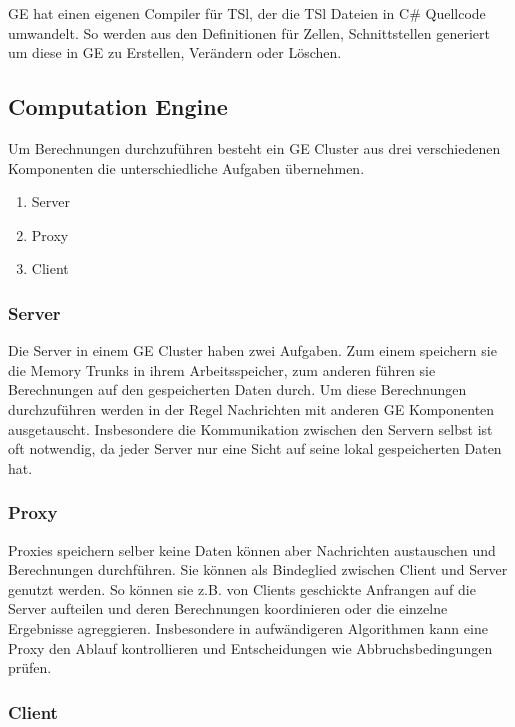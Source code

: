 GE hat einen eigenen Compiler für TSl, der die TSl Dateien in C\# Quellcode umwandelt. So werden aus den Definitionen für Zellen, Schnittstellen
generiert um diese in GE zu Erstellen, Verändern oder Löschen. 

\subsection{Computation Engine}

Um Berechnungen durchzuführen besteht ein GE Cluster aus drei verschiedenen Komponenten die unterschiedliche Aufgaben übernehmen.

\begin{enumerate}
  \item Server
  \item Proxy
  \item Client
\end{enumerate}


\subsubsection{Server}

Die Server in einem GE Cluster haben zwei Aufgaben. Zum einem speichern sie die Memory Trunks in ihrem Arbeitsspeicher, 
zum anderen führen sie Berechnungen auf den gespeicherten Daten durch.
Um diese Berechnungen durchzuführen werden in der Regel Nachrichten mit anderen GE Komponenten ausgetauscht. Insbesondere die Kommunikation zwischen den Servern
selbst ist oft notwendig, da jeder Server nur eine Sicht auf seine lokal gespeicherten Daten hat.

\subsubsection{Proxy}

Proxies speichern selber keine Daten können aber Nachrichten austauschen und Berechnungen durchführen. Sie können als 
Bindeglied zwischen Client und Server genutzt werden. So können sie z.B. von Clients geschickte Anfrangen auf die Server aufteilen und deren
Berechnungen koordinieren oder die einzelne Ergebnisse agreggieren. Insbesondere in aufwändigeren Algorithmen kann eine Proxy 
den Ablauf kontrollieren und Entscheidungen wie Abbruchsbedingungen prüfen.

\subsubsection{Client}

